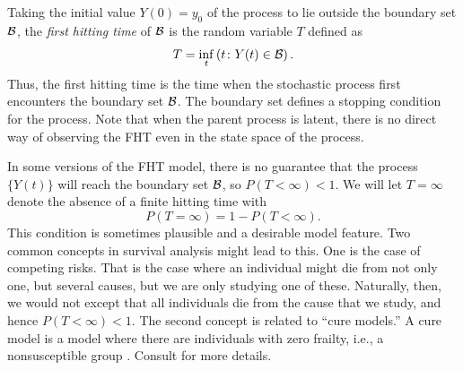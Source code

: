 Taking the initial value $Y(0)=y_0$ of the process to lie outside the boundary set $\mathcal{B}$, the \textit{first hitting time} of $\mathcal{B}$ is the random variable $T$ defined as
\begin{equation}\label{eq:fht-t}
    T=\inf_t\left(t\colon Y(t)\in\mathcal{B}\right).
\end{equation}
Thus, the first hitting time is the time when the stochastic process first encounters the boundary set $\mathcal{B}$. The boundary set defines a stopping condition for the process. Note that when the parent process is latent, there is no direct way of observing the FHT even in the state space of the process.

In some versions of the FHT model, there is no guarantee that the process $\{Y(t)\}$ will reach the boundary set $\mathcal{B}$, so $P(T<\infty)<1$. We will let $T=\infty$ denote the absence of a finite hitting time with
\begin{equation}
    P(T=\infty)=1-P(T<\infty).
\end{equation}
This condition is sometimes plausible and a desirable model feature.
Two common concepts in survival analysis might lead to this.
One is the case of competing risks.
That is the case where an individual might die from not only one, but several causes, but we are only studying one of these.
Naturally, then, we would not except that all individuals die from the cause that we study, and hence $P(T<\infty)<1$.
The second concept is related to ``cure models.''
A cure model is a model where there are individuals with zero frailty, i.e., a nonsusceptible group \citep{ABG}.
Consult \citet{maller1996survival} for more details.

